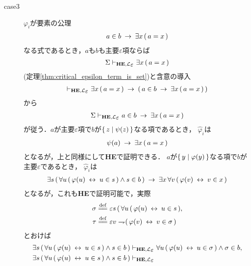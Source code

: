 \begin{metaprf}
\begin{description}
			\item[case3] $\varphi_{i}$が要素の公理
				\begin{align}
					a \in b \hspace{0.25em}\rightarrow\hspace{0.25em} \exists x\, (\, a = x\, )
				\end{align}
				なる式であるとき，$a$も$b$も主要$\varepsilon$項ならば
				\begin{align}
					\Sigma \provable{\mbox{{\bf HE}},\lang{\varepsilon}} \exists x\, (\, a = x\, )
				\end{align}
				(定理\ref{thm:critical_epsilon_term_is_set})と含意の導入
				\begin{align}
					\provable{\mbox{{\bf HE}},\lang{\varepsilon}} \exists x\, (\, a = x\, )
					\rarrow (\, a \in b \rarrow \exists x\, (\, a = x\, )\, )
				\end{align}
				から
				\begin{align}
					\Sigma \provable{\mbox{{\bf HE}},\lang{\varepsilon}} a \in b \rarrow \exists x\, (\, a = x\, )
				\end{align}
				が従う．$a$が主要$\varepsilon$項で$b$が$\{\, z \mid \psi(z)\, \}$なる項であるとき，
				$\widehat{\varphi}_{i}$は
				\begin{align}
					\psi(a) \hspace{0.25em}\rightarrow\hspace{0.25em} \exists x\, (\, a = x\, )
				\end{align}
				となるが，上と同様にして{\bf HE}で証明できる．
				$a$が$\{\, y \mid \varphi(y)\, \}$なる項で$b$が主要$\varepsilon$であるとき，
				$\widehat{\varphi}_{i}$は
				\begin{align}
					\exists s\, (\, \forall u\, (\, \varphi(u) \hspace{0.25em}\leftrightarrow\hspace{0.25em} u \in s\, )
					\wedge s \in b\, ) \hspace{0.25em}\rightarrow\hspace{0.25em} \exists x\, \forall v\, (\, \varphi(v) \hspace{0.25em}\leftrightarrow\hspace{0.25em} v \in x\, )
				\end{align}
				となるが，これも{\bf HE}で証明可能で，実際
				\begin{align}
					\sigma &\defeq \varepsilon s\, (\, \forall u\, (\, \varphi(u) \lrarrow u \in s\, ), \\
					\tau &\defeq \varepsilon v \negation (\, \varphi(v) \lrarrow v \in \sigma\, )
				\end{align}
				とおけば
				\begin{align}
					\exists s\, (\, \forall u\, (\, \varphi(u) \lrarrow u \in s\, )
					\wedge s \in b\, )
					&\provable{\mbox{{\bf HE}},\lang{\varepsilon}} 
					\forall u\, (\, \varphi(u) \lrarrow u \in \sigma\, )
					\wedge \sigma \in b, \\
					\exists s\, (\, \forall u\, (\, \varphi(u) \lrarrow u \in s\, )
					\wedge s \in b\, )
					&\provable{\mbox{{\bf HE}},\lang{\varepsilon}} 

\end{align}
\end{description}
\end{metaprf}
